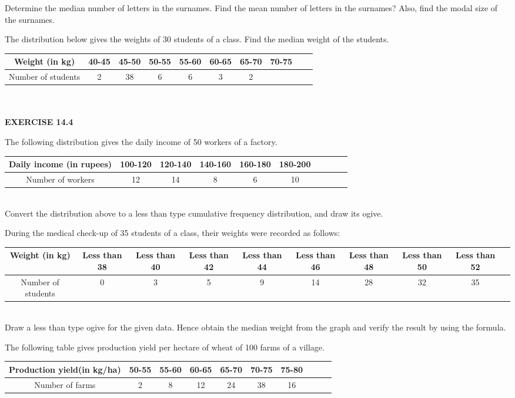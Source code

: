 Determine the median number of letters in the surnames. Find the mean number of
letters in the surnames? Also, find the modal size of the surnames.
\item The distribution below gives the weights of 30 students of a class. Find the median
weight of the students.
\begin{tabular}{|c|c|c|c|c|c|c|c|c|c|}
\hline
Weight (in kg)&40-45&45-50&50-55&55-60&60-65&65-70&70-75\\
\hline
Number of students&2&38&6&6&3&2\\
\hline
\end{tabular}\\\\
{\Large \textbf{EXERCISE 14.4}}
\item The following distribution gives the daily income of 50 workers of a factory.
\begin{tabular}{|c|c|c|c|c|c|c|c|c|c|}
\hline
Daily income (in rupees)&100-120&120-140&140-160&160-180&180-200\\
\hline
Number of workers&12&14&8&6&10\\
\hline
\end{tabular}\\
Convert the distribution above to a less than type cumulative frequency distribution,
and draw its ogive.
\item During the medical check-up of 35 students of a class, their weights were recorded as
follows:
\begin{tabular}{|c|c|c|c|c|c|c|c|c|c|}
\hline
Weight (in kg)&Less than 38&Less than 40&Less than 42&Less than 44&Less than 46&Less than 48& Less than 50&Less than 52\\
\hline
Number of students&0&3&5&9&14&28&32&35\\
\hline
\end{tabular}\\
Draw a less than type ogive for the given data. Hence obtain the median weight from
the graph and verify the result by using the formula.
\item The following table gives production yield per hectare of wheat of 100 farms of a village.
\begin{tabular}{|c|c|c|c|c|c|c|c|c|c|}
\hline
Production yield(in kg/ha)&50-55&55-60&60-65&65-70&70-75&75-80
\\
\hline
Number of farms&2&8&12&24&38&16\\
\hline
\end{tabular}\\
        
